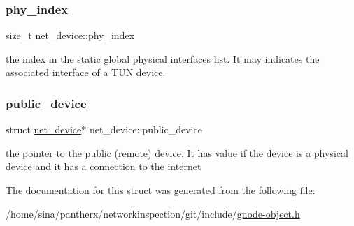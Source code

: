 \subsubsection{\texorpdfstring{phy\+\_\+index}{phy\_index}}
{\footnotesize\ttfamily size\+\_\+t net\+\_\+device\+::phy\+\_\+index}



the index in the static global physical interfaces list. It may indicates the associated interface of a T\+UN device. 

\mbox{\label{structnet__device_aa50aa45beac692be04baf4faf9d063d4}} 
\subsubsection{\texorpdfstring{public\+\_\+device}{public\_device}}
{\footnotesize\ttfamily struct \hyperlink{structnet__device}{net\+\_\+device}$\ast$ net\+\_\+device\+::public\+\_\+device}



the pointer to the public (remote) device. It has value if the device is a physical device and it has a connection to the internet 



The documentation for this struct was generated from the following file\+:\begin{DoxyCompactItemize}
\item 
/home/sina/pantherx/networkinspection/git/include/\hyperlink{gnode-object_8h}{gnode-\/object.\+h}\end{DoxyCompactItemize}
